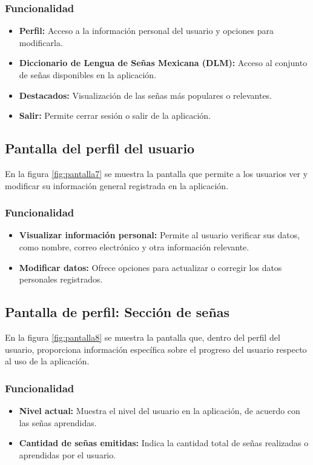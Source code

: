 \subsubsection{Funcionalidad}
\begin{itemize}
    \item \textbf{Perfil:} Acceso a la información personal del usuario y opciones para modificarla.
    \item \textbf{Diccionario de Lengua de Señas Mexicana (DLM):} Acceso al conjunto de señas disponibles en la aplicación.
    \item \textbf{Destacados:} Visualización de las señas más populares o relevantes.
    \item \textbf{Salir:} Permite cerrar sesión o salir de la aplicación.
\end{itemize}
\subsection{Pantalla del perfil del usuario}


En la figura \ref{fig:pantalla7} se muestra la pantalla que permite a los usuarios ver y modificar su información general registrada en la aplicación.

\subsubsection{Funcionalidad}
\begin{itemize}
    \item \textbf{Visualizar información personal:} Permite al usuario verificar sus datos, como nombre, correo electrónico y otra información relevante.
    \item \textbf{Modificar datos:} Ofrece opciones para actualizar o corregir los datos personales registrados.
\end{itemize}
\subsection{Pantalla de perfil: Sección de señas}


En la figura \ref{fig:pantalla8} se muestra la pantalla que, dentro del perfil del usuario, proporciona información específica sobre el progreso del usuario respecto al uso de la aplicación.

\subsubsection{Funcionalidad}
\begin{itemize}
    \item \textbf{Nivel actual:} Muestra el nivel del usuario en la aplicación, de acuerdo con las señas aprendidas.
    \item \textbf{Cantidad de señas emitidas:} Indica la cantidad total de señas realizadas o aprendidas por el usuario.
\end{itemize}
